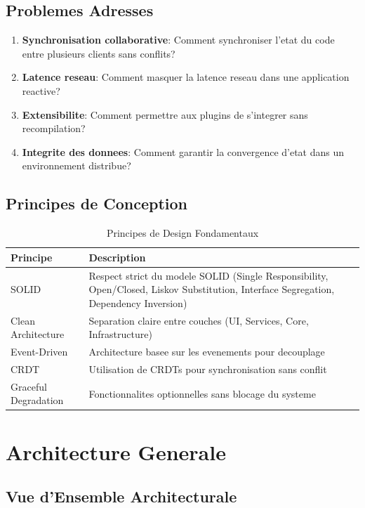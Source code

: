 \documentclass[11pt,a4paper,hidelinks]{book}
\begin{document}
\subsection{Problemes Adresses}

\begin{enumerate}
    \item \textbf{Synchronisation collaborative}: Comment synchroniser l'etat du code entre plusieurs clients sans conflits?
    \item \textbf{Latence reseau}: Comment masquer la latence reseau dans une application reactive?
    \item \textbf{Extensibilite}: Comment permettre aux plugins de s'integrer sans recompilation?
    \item \textbf{Integrite des donnees}: Comment garantir la convergence d'etat dans un environnement distribue?
\end{enumerate}

\subsection{Principes de Conception}

\begin{table}[H]
\centering
\caption{Principes de Design Fondamentaux}
\begin{tabularx}{\textwidth}{l X}
\toprule
\textbf{Principe} & \textbf{Description} \\
\midrule
SOLID & Respect strict du modele SOLID (Single Responsibility, Open/Closed, Liskov Substitution, Interface Segregation, Dependency Inversion) \\
Clean Architecture & Separation claire entre couches (UI, Services, Core, Infrastructure) \\
Event-Driven & Architecture basee sur les evenements pour decouplage \\
CRDT & Utilisation de CRDTs pour synchronisation sans conflit \\
Graceful Degradation & Fonctionnalites optionnelles sans blocage du systeme \\
\bottomrule
\end{tabularx}
\end{table}

\section{Architecture Generale}

\subsection{Vue d'Ensemble Architecturale}
\end{document}
